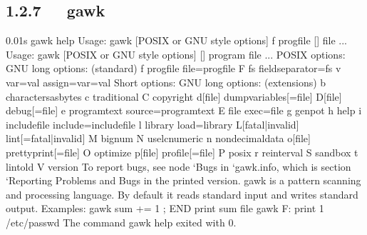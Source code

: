 \documentclass[letterpaper,12pt,english]{sphinxmanual}
\begin{document}
\subsection{1.2.7   gawk}
\label{\detokenize{001software/001install/linux:gawk}}
\begin{sphinxVerbatim}[commandchars=\\\{\}]
0.01s\PYGZdl{} gawk \PYGZhy{}\PYGZhy{}help
Usage: gawk [POSIX or GNU style options] \PYGZhy{}f progfile [\PYGZhy{}\PYGZhy{}] file ...
Usage: gawk [POSIX or GNU style options] [\PYGZhy{}\PYGZhy{}] \PYGZsq{}program\PYGZsq{} file ...
POSIX options:    GNU long options: (standard)
  \PYGZhy{}f progfile   \PYGZhy{}\PYGZhy{}file=progfile
  \PYGZhy{}F fs     \PYGZhy{}\PYGZhy{}field\PYGZhy{}separator=fs
  \PYGZhy{}v var=val    \PYGZhy{}\PYGZhy{}assign=var=val
Short options:    GNU long options: (extensions)
  \PYGZhy{}b      \PYGZhy{}\PYGZhy{}characters\PYGZhy{}as\PYGZhy{}bytes
  \PYGZhy{}c      \PYGZhy{}\PYGZhy{}traditional
  \PYGZhy{}C      \PYGZhy{}\PYGZhy{}copyright
  \PYGZhy{}d[file]    \PYGZhy{}\PYGZhy{}dump\PYGZhy{}variables[=file]
  \PYGZhy{}D[file]    \PYGZhy{}\PYGZhy{}debug[=file]
  \PYGZhy{}e \PYGZsq{}program\PYGZhy{}text\PYGZsq{} \PYGZhy{}\PYGZhy{}source=\PYGZsq{}program\PYGZhy{}text\PYGZsq{}
  \PYGZhy{}E file     \PYGZhy{}\PYGZhy{}exec=file
  \PYGZhy{}g      \PYGZhy{}\PYGZhy{}gen\PYGZhy{}pot
  \PYGZhy{}h      \PYGZhy{}\PYGZhy{}help
  \PYGZhy{}i includefile    \PYGZhy{}\PYGZhy{}include=includefile
  \PYGZhy{}l library    \PYGZhy{}\PYGZhy{}load=library
  \PYGZhy{}L[fatal|invalid] \PYGZhy{}\PYGZhy{}lint[=fatal|invalid]
  \PYGZhy{}M      \PYGZhy{}\PYGZhy{}bignum
  \PYGZhy{}N      \PYGZhy{}\PYGZhy{}use\PYGZhy{}lc\PYGZhy{}numeric
  \PYGZhy{}n      \PYGZhy{}\PYGZhy{}non\PYGZhy{}decimal\PYGZhy{}data
  \PYGZhy{}o[file]    \PYGZhy{}\PYGZhy{}pretty\PYGZhy{}print[=file]
  \PYGZhy{}O      \PYGZhy{}\PYGZhy{}optimize
  \PYGZhy{}p[file]    \PYGZhy{}\PYGZhy{}profile[=file]
  \PYGZhy{}P      \PYGZhy{}\PYGZhy{}posix
  \PYGZhy{}r      \PYGZhy{}\PYGZhy{}re\PYGZhy{}interval
  \PYGZhy{}S      \PYGZhy{}\PYGZhy{}sandbox
  \PYGZhy{}t      \PYGZhy{}\PYGZhy{}lint\PYGZhy{}old
  \PYGZhy{}V      \PYGZhy{}\PYGZhy{}version
To report bugs, see node `Bugs\PYGZsq{} in `gawk.info\PYGZsq{}, which is
section `Reporting Problems and Bugs\PYGZsq{} in the printed version.
gawk is a pattern scanning and processing language.
By default it reads standard input and writes standard output.
Examples:
  gawk \PYGZsq{}\PYGZob{} sum += \PYGZdl{}1 \PYGZcb{}; END \PYGZob{} print sum \PYGZcb{}\PYGZsq{} file
  gawk \PYGZhy{}F: \PYGZsq{}\PYGZob{} print \PYGZdl{}1 \PYGZcb{}\PYGZsq{} /etc/passwd
The command \PYGZdq{}gawk \PYGZhy{}\PYGZhy{}help\PYGZdq{} exited with 0.
\end{sphinxVerbatim}
\end{document}
